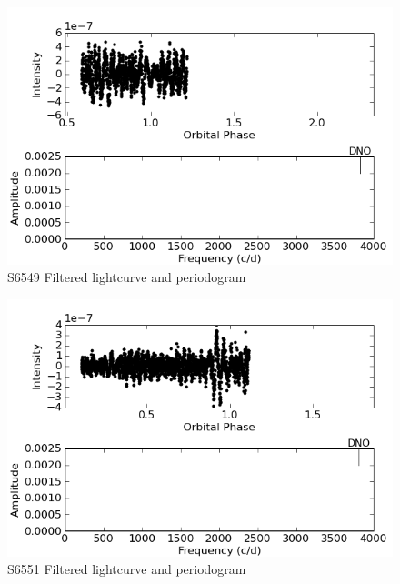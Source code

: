 \begin{figure}
 \centering
 \includegraphics[bb=0 0 600 400,width=0.85\columnwidth]{images/archive_phot/S6549/S6549d_FF.png}
 \caption{S6549 Filtered lightcurve and periodogram}
 \label{S6549_c_FF}
\end{figure}

\begin{figure}
 \centering
 \includegraphics[bb=0 0 600 400,width=0.85\columnwidth]{images/archive_phot/S6551/S6551d_FF.png}
 \caption{S6551 Filtered lightcurve and periodogram}
 \label{S6551_c_FF}
\end{figure}



